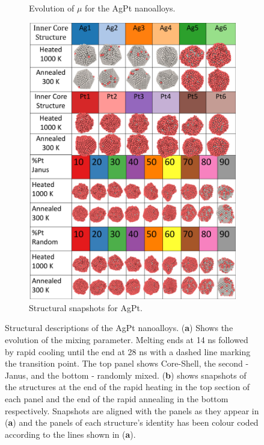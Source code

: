 \begin{figure}
\begin{subfigure}{0.39\textwidth}
    \caption{Evolution of $\mu$ for the AgPt nanoalloys.}
    \label{fig:AgPtMix}
\end{subfigure}
\begin{subfigure}{0.56\textwidth}
    \includegraphics[width=\linewidth]{figures/MD/Alloys/AgPt_Struts.pdf}
    \caption{Structural snapshots for AgPt.}
    \label{fig:AgPt_Struts}
\end{subfigure}
    \caption{Structural descriptions of the AgPt nanoalloys. (\textbf{a}) Shows the evolution of the mixing parameter. Melting ends at 14 ns followed by rapid cooling until the end at 28 ns with a dashed line marking the transition point. The top panel shows Core-Shell, the second - Janus, and the bottom - randomly mixed. (\textbf{b}) shows snapshots of the structures at the end of the rapid heating in the top section of each panel and the end of the rapid annealing in the bottom respectively. Snapshots are aligned with the panels as they appear in (\textbf{a}) and the panels of each structure's identity has been colour coded according to the lines shown in (\textbf{a}).}
    \label{fig:AgPt_NA}
\end{figure}


